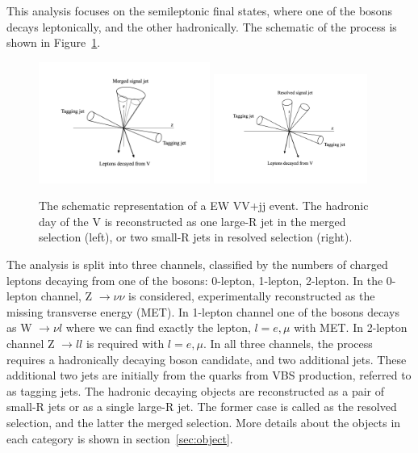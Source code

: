 This analysis focuses on the semileptonic final states, where one of the bosons decays leptonically, and the other hadronically. 
The schematic of the process is shown in Figure~\ref{fig:VBStopology}.


\begin{figure}[H]
\begin{center}
 \includegraphics[width=0.50\textwidth,keepaspectratio]{figures/VBStopologyMerged}
 \includegraphics[width=0.45\textwidth,keepaspectratio]{figures/VBStopologyResolved}
\caption{
The schematic representation of a EW VV+jj event. The hadronic day of the V is reconstructed as one large-R jet in the merged selection (left), or two small-R jets in resolved selection (right).
}
\label{fig:VBStopology}
\end{center}
\end{figure}

The analysis is split into three channels, classified by the numbers of charged leptons decaying from one of the bosons: 0-lepton, 1-lepton, 2-lepton. 
In the 0-lepton channel, Z $\rightarrow \nu \nu$ is considered, experimentally reconstructed as the missing transverse energy (MET). In 1-lepton channel one of the bosons decays as W $\rightarrow \nu l$ where we can find exactly the lepton, $l = e, \mu$ with MET. In 2-lepton channel Z $\rightarrow l l$ is required with $l = e, \mu$. 
In all three channels, the process requires a hadronically decaying boson candidate, and two additional jets. 
These additional two jets are initially from the quarks from VBS production, referred to as tagging jets. The hadronic decaying objects are reconstructed as a pair of small-R jets or as a single large-R jet. The former case is called as the resolved selection, and the latter the merged selection. More details about the objects in each category is shown in section~\ref{sec:object}.

